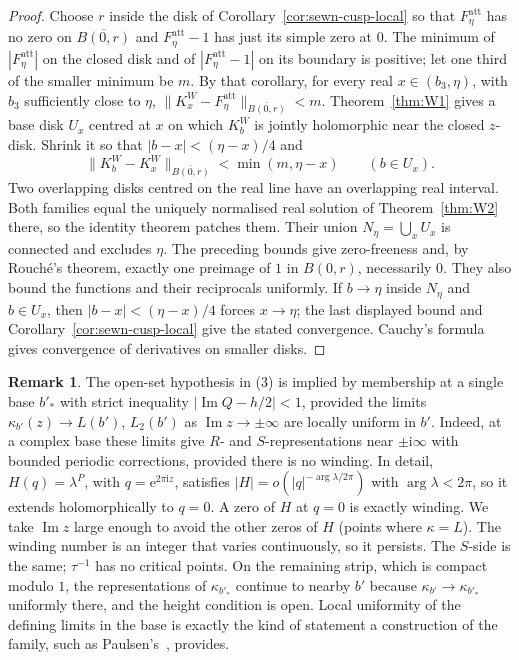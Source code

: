 \documentclass[11pt,a4paper]{article}
\theoremstyle{definition}
\newtheorem{remark}[theorem]{Remark}
\newcommand{\Rr}{R}
\newcommand{\Kk}{K}
\newcommand{\eee}{\mathrm{e}}
\newcommand{\ii}{\mathrm{i}}
\begin{document}
\begin{proof}
Choose $r$ inside the disk of Corollary~\ref{cor:sewn-cusp-local}
so that $F_\eta^{\mathrm{att}}$ has no zero on $\overline{B(0,r)}$
and $F_\eta^{\mathrm{att}}-1$ has just its simple zero at $0$.
The minimum of $|F_\eta^{\mathrm{att}}|$ on the closed disk and of
$|F_\eta^{\mathrm{att}}-1|$ on its boundary is positive; let one third
of the smaller minimum be $m$.  By that corollary, for every real
$x\in(b_3,\eta)$, with $b_3$ sufficiently close to $\eta$,
$\|\Kk_x^W-F_\eta^{\mathrm{att}}\|_{\overline{B(0,r)}}<m$.
Theorem~\ref{thm:W1} gives a base disk $U_x$ centred at $x$ on which
$\Kk_b^W$ is jointly holomorphic near the closed $z$-disk.  Shrink it
so that $|b-x|<(\eta-x)/4$ and
\[
 \|\Kk_b^W-\Kk_x^W\|_{\overline{B(0,r)}}
 <\min(m,\eta-x)\qquad(b\in U_x).
\]
Two overlapping disks centred on the real line have an overlapping real
interval.  Both families equal the uniquely normalised real solution of
Theorem~\ref{thm:W2} there, so the identity theorem patches them.
Their union $N_\eta=\bigcup_x U_x$ is connected and excludes $\eta$.
The preceding bounds give zero-freeness and, by Rouch\'e's theorem,
exactly one preimage of $1$ in $B(0,r)$, necessarily $0$.
They also bound the functions and their reciprocals uniformly.
If $b\to\eta$ inside $N_\eta$ and $b\in U_x$, then
$|b-x|<(\eta-x)/4$ forces $x\to\eta$; the last displayed bound and
Corollary~\ref{cor:sewn-cusp-local} give the stated convergence.
Cauchy's formula gives convergence of derivatives on smaller disks.
\end{proof}

\begin{remark}\label{rem:open}
The open-set hypothesis in (3) is implied by membership at a single base
$b'_*$ with strict inequality $|\operatorname{Im}Q-h/2|<1$, provided the limits $\kappa_{b'}(z)\to L(b')$, $L_2(b')$ as
$\operatorname{Im}z\to\pm\infty$ are locally uniform in $b'$.  Indeed, at a
complex base these limits give $\Rr$- and $S$-representations near
$\pm\ii\infty$ with bounded periodic corrections, provided there is no winding.
In detail, $H(q)=\lambda^{P}$, with $q=\eee^{2\pi\ii z}$, satisfies
$|H|=o(|q|^{-\arg\lambda/2\pi})$ with $\arg\lambda<2\pi$, so it extends
holomorphically to $q=0$.  A zero of $H$ at $q=0$ is exactly winding.  We take
$\operatorname{Im}z$ large enough to avoid the other zeros of $H$ (points where
$\kappa=L$).  The winding number is an integer that varies continuously, so it
persists.  The $S$-side is the same; $\tau^{-1}$ has no critical points.
On the remaining strip, which is compact modulo $1$, the representations of
$\kappa_{b'_*}$ continue to nearby $b'$ because $\kappa_{b'}\to\kappa_{b'_*}$
uniformly there, and the height condition is open.  Local uniformity of the
defining limits in the base is exactly the kind of statement a construction
of the family, such as Paulsen's~\cite{Paulsen2019}, provides.
\end{remark}
\end{document}
